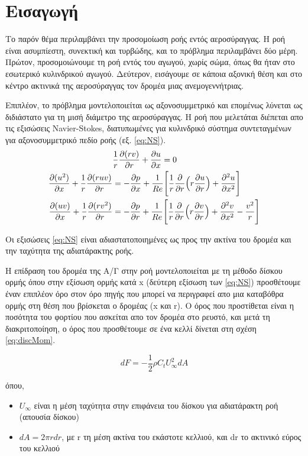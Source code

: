 \section*{Εισαγωγή}

Το παρόν θέμα περιλαμβάνει την προσομοίωση ροής εντός αεροσύραγγας. Η ροή είναι ασυμπίεστη, συνεκτική και τυρβώδης, και το πρόβλημα περιλαμβάνει δύο μέρη. Πρώτον, προσομοιώνουμε τη ροή εντός του αγωγού, χωρίς σώμα, όπως θα ήταν στο εσωτερικό κυλινδρικού αγωγού. Δεύτερον, εισάγουμε σε κάποια αξονική θέση και στο κέντρο ακτινικά της αεροσύραγγας τον δρομέα μιας ανεμογεννήτριας. 

Επιπλέον, το πρόβλημα μοντελοποιείται ως αξονοσυμμετρικό και επομένως λύνεται ως διδιάστατο για τη μισή διάμετρο της αεροσύραγγας.
Η ροή που μελετάται διέπεται απο τις εξισώσεις Navier-Stokes, διατυπωμένες για κυλινδρικό σύστημα συντεταγμένων για αξονοσυμμετρικό πεδίο ροής (εξ. \ref{eq:NS}).
\begin{equation}
    \begin{aligned}
        &\dfrac{1}{r}\dfrac{\partial(rv)}{\partial r} + \dfrac{\partial u}{\partial x} = 0\\ 
        \dfrac{\partial (u^2)}{\partial x}+\dfrac{1}{r}\dfrac{\partial (ruv)}{\partial r} &= -\dfrac{\partial p}{\partial x} + \dfrac{1}{Re}\Bigg[\dfrac{1}{r}\dfrac{\partial }{\partial r}\Big(r\dfrac{\partial u}{\partial r}\Big) + \dfrac{\partial ^2u}{\partial x^2}\Bigg]\\
        \dfrac{\partial (uv)}{\partial x}+\dfrac{1}{r}\dfrac{\partial (rv^2)}{\partial r}&=-\dfrac{\partial p}{\partial r}+\dfrac{1}{Re}\Bigg[\dfrac{1}{r}\dfrac{\partial }{\partial r}\Big(r\dfrac{\partial v}{\partial r}\Big)+\dfrac{\partial ^2v}{\partial x^2}-\dfrac{v^2}{r}\Bigg] 
    \end{aligned}
    \label{eq:NS}
\end{equation}

Οι εξισώσεις \ref{eq:NS} είναι αδιαστατοποιημένες ως προς την ακτίνα του δρομέα και την ταχύτητα της αδιατάρακτης ροής.

Η επίδραση του δρομέα της Α/Γ στην ροή μοντελοποιείται με τη μέθοδο δίσκου ορμής όπου στην εξίσωση ορμής κατά x (δεύτερη εξίσωση των \ref{eq:NS}) προσθέτουμε έναν επιπλέον όρο στον όρο πηγής που μπορεί να περιγραφεί απο μια καταβόθρα ορμής στη θέση που βρίσκεται ο δρομέας (x και r). Ο όρος που προστίθεται είναι η ποσότητα του φορτίου που ασκείται απο τον δρομέα στο ρευστό, και μετά τη διακριτοποίηση, ο όρος που προσθέτουμε σε ένα κελλί δίνεται στη σχέση \ref{eq:discMom}.

\begin{equation}
    dF = -\dfrac{1}{2}\rho C_tU^2_{\infty}dA 
    \label{eq:discMom}
\end{equation}

όπου,
\begin{itemize}
    \item $U_{\infty}$ είναι η μέση ταχύτητα στην επιφάνεια του δίσκου για αδιατάρακτη ροή (απουσία δίσκου)
    \item $dA = 2\pi rdr$, με r τη μέση ακτίνα του εκάστοτε κελλιού, και dr το ακτινικό εύρος του κελλιού
\end{itemize}

